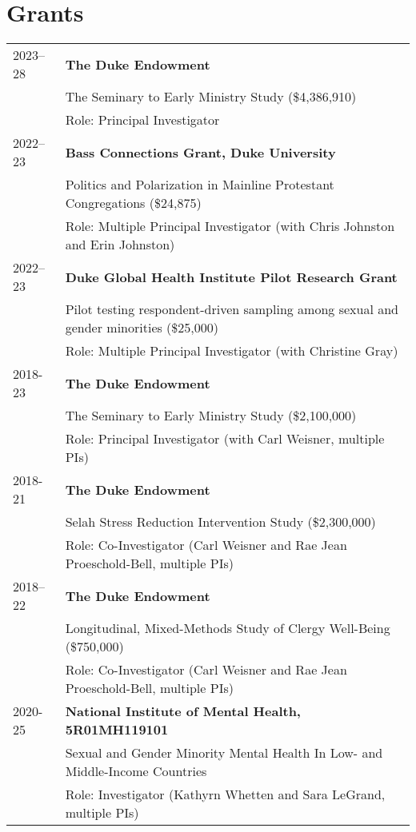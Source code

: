 
\section*{Grants}
\begin{longtable}{p{} p{}}
	
2023--28 & \textbf{The Duke Endowment}\\
& The Seminary to Early Ministry Study (\$4,386,910)\\
& Role: Principal Investigator\\

2022--23 & \textbf{Bass Connections Grant, Duke University}\\
& Politics and Polarization in Mainline Protestant Congregations (\$24,875)\\
& Role: Multiple Principal Investigator (with Chris Johnston and Erin Johnston)\\

2022--23 & \textbf{Duke Global Health Institute Pilot Research Grant}\\
& Pilot testing respondent-driven sampling among sexual and gender minorities (\$25,000)\\
& Role: Multiple Principal Investigator (with Christine Gray)\\

2018-23 & \textbf{The Duke Endowment}\\
& The Seminary to Early Ministry Study (\$2,100,000)\\
& Role: Principal Investigator (with Carl Weisner, multiple PIs)\\
\vspace{.2em}
2018-21 & \textbf{The Duke Endowment}\\
& Selah Stress Reduction Intervention Study (\$2,300,000)\\
& Role: Co-Investigator (Carl Weisner and Rae Jean Proeschold-Bell, multiple PIs)\\

2018--22 & \textbf{The Duke Endowment}\\
& Longitudinal, Mixed-Methods Study of Clergy Well-Being (\$750,000)\\
& Role: Co-Investigator (Carl Weisner and Rae Jean Proeschold-Bell, multiple PIs)\\

2020-25 & \textbf{National Institute of Mental Health, 5R01MH119101} \\
& Sexual and Gender Minority Mental Health In Low- and Middle-Income Countries \\
& Role: Investigator (Kathyrn Whetten and Sara LeGrand, multiple PIs)\\
\end{longtable}

